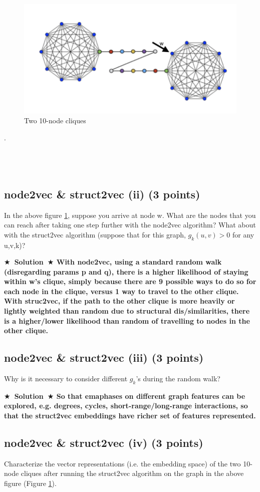 \documentclass{article}
\numberwithin{figure}{section}
\newcommand{\Solution}[1]{{\medskip \color{red} \bf $\bigstar$~\sf \textbf{Solution}~$\bigstar$ \sf #1 } \bigskip}
\begin{document}
\begin{figure}[!htb]
\centering
  \includegraphics[width=0.6\columnwidth]{CS224W_Homework1/fig5.png}
  \caption{Two 10-node cliques}
  \label{fig:10-node}
\end{figure}

.\\\\\\\\
\subsection{ node2vec \& struct2vec (ii) (3 points)}
In the above figure \ref{fig:10-node}, suppose you arrive at node w. What are the nodes that you can reach after taking one step further with the node2vec algorithm? What about with the struct2vec algorithm (suppose that for this graph, $g_k(u, v) > 0$ for any u,v,k)?

\Solution{With node2vec, using a standard random walk (disregarding params p and q), there is a higher likelihood of staying within w's clique, simply because there are 9 possible ways to do so for each node in the clique, versus 1 way to travel to the other clique.
With struc2vec, if the path to the other clique is more heavily or lightly weighted than random due to structural dis/similarities, there is a higher/lower likelihood than random of travelling to nodes in the other clique.}

\subsection{node2vec \& struct2vec (iii) (3 points)}
Why is it necessary to consider different $g_k$'s during the random walk?

\Solution{So that emaphases on different graph features can be explored, e.g. degrees, cycles, short-range/long-range interactions,
 so that the struct2vec embeddings have richer set of features represented.}

\subsection{node2vec \& struct2vec (iv) (3 points)}
Characterize the vector representations (i.e. the embedding space) of the two 10-node cliques after running the struct2vec algorithm on the graph in the above figure (Figure \ref{fig:10-node}).
\end{document}
